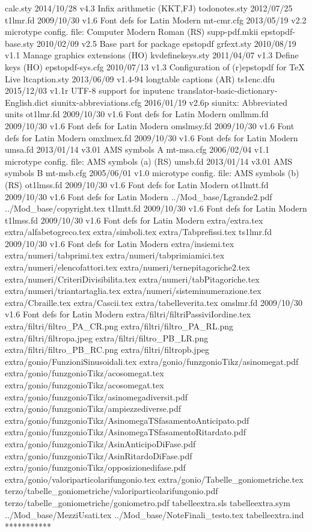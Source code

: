     calc.sty    2014/10/28 v4.3 Infix arithmetic (KKT,FJ)
todonotes.sty    2012/07/25
   t1lmr.fd    2009/10/30 v1.6 Font defs for Latin Modern
  mt-cmr.cfg    2013/05/19 v2.2 microtype config. file: Computer Modern Roman (RS)
supp-pdf.mkii
epstopdf-base.sty    2010/02/09 v2.5 Base part for package epstopdf
  grfext.sty    2010/08/19 v1.1 Manage graphics extensions (HO)
kvdefinekeys.sty    2011/04/07 v1.3 Define keys (HO)
epstopdf-sys.cfg    2010/07/13 v1.3 Configuration of (r)epstopdf for TeX Live
ltcaption.sty    2013/06/09 v1.4-94 longtable captions (AR)
  ts1enc.dfu    2015/12/03 v1.1r UTF-8 support for inputenc
translator-basic-dictionary-English.dict    
siunitx-abbreviations.cfg    2016/01/19 v2.6p siunitx: Abbreviated units
  ot1lmr.fd    2009/10/30 v1.6 Font defs for Latin Modern
  omllmm.fd    2009/10/30 v1.6 Font defs for Latin Modern
 omslmsy.fd    2009/10/30 v1.6 Font defs for Latin Modern
 omxlmex.fd    2009/10/30 v1.6 Font defs for Latin Modern
    umsa.fd    2013/01/14 v3.01 AMS symbols A
  mt-msa.cfg    2006/02/04 v1.1 microtype config. file: AMS symbols (a) (RS)
    umsb.fd    2013/01/14 v3.01 AMS symbols B
  mt-msb.cfg    2005/06/01 v1.0 microtype config. file: AMS symbols (b) (RS)
 ot1lmss.fd    2009/10/30 v1.6 Font defs for Latin Modern
 ot1lmtt.fd    2009/10/30 v1.6 Font defs for Latin Modern
../Mod_base/Lgrande2.pdf
../Mod_base/copyright.tex
  t1lmtt.fd    2009/10/30 v1.6 Font defs for Latin Modern
  t1lmss.fd    2009/10/30 v1.6 Font defs for Latin Modern
extra/extra.tex
extra/alfabetogreco.tex
extra/simboli.tex
extra/Tabprefissi.tex
  ts1lmr.fd    2009/10/30 v1.6 Font defs for Latin Modern
extra/insiemi.tex
extra/numeri/tabprimi.tex
extra/numeri/tabprimiamici.tex
extra/numeri/elencofattori.tex
extra/numeri/ternepitagoriche2.tex
extra/numeri/CriteriDivisibilita.tex
extra/numeri/tabPitagoriche.tex
extra/numeri/triantartaglia.tex
extra/numeri/sisteminumerazione.tex
extra/Cbraille.tex
extra/Cascii.tex
extra/tabelleverita.tex
  omslmr.fd    2009/10/30 v1.6 Font defs for Latin Modern
extra/filtri/filtriPassiviIordine.tex
extra/filtri/filtro_PA_CR.png
extra/filtri/filtro_PA_RL.png
extra/filtri/filtropa.jpeg
extra/filtri/filtro_PB_LR.png
extra/filtri/filtro_PB_RC.png
extra/filtri/filtropb.jpeg
extra/gonio/FunzioniSinusoidali.tex
extra/gonio/funzgonioTikz/asinomegat.pdf
extra/gonio/funzgonioTikz/acosomegat.tex
extra/gonio/funzgonioTikz/acosomegat.tex
extra/gonio/funzgonioTikz/asinomegadiversit.pdf
extra/gonio/funzgonioTikz/ampiezzediverse.pdf
extra/gonio/funzgonioTikz/AsinomegaTSfasamentoAnticipato.pdf
extra/gonio/funzgonioTikz/AsinomegaTSfasamentoRitardato.pdf
extra/gonio/funzgonioTikz/AsinAnticipoDiFase.pdf
extra/gonio/funzgonioTikz/AsinRitardoDiFase.pdf
extra/gonio/funzgonioTikz/opposizionedifase.pdf
extra/gonio/valoriparticolarifungonio.tex
extra/gonio/Tabelle_goniometriche.tex
terzo/tabelle_goniometriche/valoriparticolarifungonio.pdf
terzo/tabelle_goniometriche/goniometro.pdf
tabelleextra.sls
tabelleextra.sym
../Mod_base/MezziUsati.tex
../Mod_base/NoteFinali_testo.tex
tabelleextra.ind
 ***********

